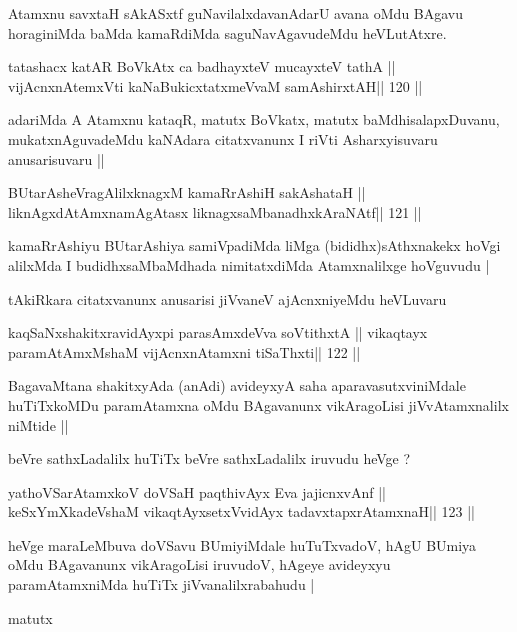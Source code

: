 \begin{artha}
Atamxnu savxtaH sAkASxtf guNavilalxdavanAdarU avana oMdu BAgavu
horaginiMda baMda kamaRdiMda saguNavAgavudeMdu heVLutAtxre.
\end{artha}

\begin{shl}
tatashacx katAR BoVkAtx ca badhayxteV mucayxteV tathA ||
vijAcnxnAtemxVti kaNaBukicxtatxmeVvaM samAshirxtAH\hfill || 120 ||
\end{shl}

\begin{artha}
adariMda A Atamxnu kataqR, matutx BoVkatx, matutx baMdhisalapxDuvanu,
mukatxnAguvadeMdu kaNAdara citatxvanunx I riVti Asharxyisuvaru
anusarisuvaru ||
\end{artha}

\begin{shl}
BUtarAsheVragAlilxknagxM kamaRrAshiH sakAshataH ||
liknAgxdAtAmxnamAgAtasx liknagxsaMbanadhxkAraNAtf\hfill || 121 ||
\end{shl}

\begin{artha}
kamaRrAshiyu BUtarAshiya samiVpadiMda liMga (bididhx)sAthxnakekx hoVgi
alilxMda I budidhxsaMbaMdhada nimitatxdiMda Atamxnalilxge  hoVguvudu |
\end{artha}

\begin{artha}
tAkiRkara citatxvanunx anusarisi jiVvaneV ajAcnxniyeMdu heVLuvaru
\end{artha}

\begin{shl}
kaqSaNxshakitxravidAyx\s pi parasAmxdeVva soVtithxtA ||
vikaqtayx paramAtAmxMshaM vijAcnxnAtamxni tiSaThxti\hfill || 122 ||
\end{shl}

\begin{artha}
BagavaMtana shakitxyAda (anAdi) avideyxyA saha aparavasutxviniMdale
huTiTxkoMDu paramAtamxna oMdu BAgavanunx vikAragoLisi jiVvAtamxnalilx
niMtide ||

beVre sathxLadalilx huTiTx beVre sathxLadalilx iruvudu heVge ?
\end{artha}

\begin{shl}
yathoVSarAtamxkoV doVSaH paqthivAyx Eva jajicnxvAnf ||
keSxYmXkadeVshaM vikaqtAyx\s\s setxV\s vidAyx tadavxtapxrAtamxnaH\hfill || 123 ||
\end{shl}

\begin{artha}
heVge maraLeMbuva doVSavu BUmiyiMdale huTuTxvadoV, hAgU BUmiya oMdu
BAgavanunx vikAragoLisi iruvudoV, hAgeye avideyxyu paramAtamxniMda
huTiTx jiVvanalilxrabahudu |

matutx
\end{artha}

